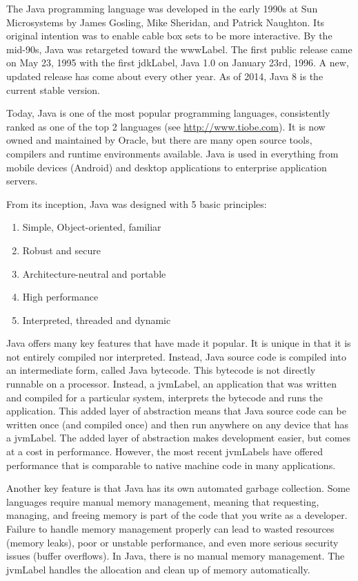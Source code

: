

The Java programming language was developed in the early 1990s at
Sun Microsystems by James Gosling, Mike Sheridan, and Patrick 
Naughton.  Its original intention was to enable cable box sets to
be more interactive.  By the mid-90s, Java was retargeted toward 
the \gls{wwwLabel}.  The first public release came on May 23, 1995
with the first \gls{jdkLabel}, Java 1.0 on January 23rd, 1996.  A 
new, updated release has come about every other year.  As of 2014, 
Java 8 is the current stable version. 

Today, Java is one of the most popular programming languages, consistently
ranked as one of the top 2 languages (see \url{http://www.tiobe.com}).  It
is now owned and maintained by Oracle, but there are many open
source tools, compilers and runtime environments available.  Java is
used in everything from mobile devices (Android) and desktop applications 
to enterprise application servers.  

From its inception, Java was designed with 5 basic principles:
\begin{enumerate}
  \item Simple, Object-oriented, familiar
  \item Robust and secure
  \item Architecture-neutral and portable
  \item High performance
  \item Interpreted, threaded and dynamic
\end{enumerate}

Java offers many key features that have made it popular.  It is unique
in that it is not entirely compiled nor interpreted.  Instead, Java source
code is compiled into an intermediate form, called Java bytecode.  
This bytecode is not directly runnable on a processor.  Instead, a
\gls{jvmLabel}, an application that was written and compiled for a 
particular system, interprets the bytecode and runs the application.
This added layer of abstraction means that Java source code can
be written once (and compiled once) and then run anywhere on 
any device that has a \gls{jvmLabel}.  The added layer of abstraction
makes development easier, but comes at a cost in performance.
However, the most recent \glspl{jvmLabel} have offered performance
that is comparable to native machine code in many applications.

Another key feature is that Java has its own automated \gls{garbage 
collection}.  Some languages require manual memory management, 
meaning that requesting, managing, and freeing memory is part
of the code that you write as a developer.  Failure to handle memory
management properly can lead to wasted resources (memory leaks), 
poor or unstable performance, and even more serious security issues 
(buffer overflows).  In Java, there is no manual memory management.
The \gls{jvmLabel} handles the allocation and clean up of memory automatically.

